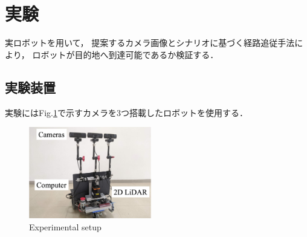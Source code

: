 \documentclass{sice-si}
\begin{document}
\section{実験}
実ロボットを用いて，
提案するカメラ画像とシナリオに基づく経路追従手法により，
ロボットが目的地へ到達可能であるか検証する．

\subsection{実験装置}
実験にはFig.\ref{fig:gamma}で示すカメラを3つ搭載したロボットを使用する．
\begin{figure}[htbp]
    \centering
     \includegraphics[height=40mm]{./figs/gamma_sensor.png}
     \caption{Experimental setup}\label{fig:gamma}
\end{figure}
\end{document}
